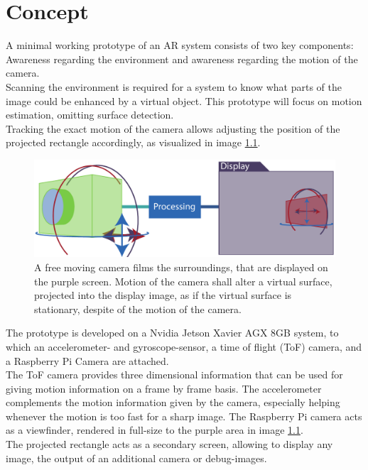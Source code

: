 \chapter{Concept}
\label{sec:Concept}
A minimal working prototype of an AR system consists of two key components: Awareness regarding the environment and awareness regarding the motion of the camera.\\
Scanning the environment is required for a system to know what parts of the image could be enhanced by a virtual object. This prototype will focus on motion estimation, omitting surface detection.\\
Tracking the exact motion of the camera allows adjusting the position of the projected rectangle accordingly, as visualized in image \ref{fig:HW_concept}.
\begin{figure}[H]
    \centering
    \includegraphics[width=1.0\textwidth]{images/concept_image.pdf}
    \caption{A free moving camera films the surroundings, that are displayed on the purple screen. Motion of the camera shall alter a virtual surface, projected into the display image, as if the virtual surface is stationary, despite of the motion of the camera.}
    \label{fig:HW_concept}
\end{figure}
The prototype is developed on a Nvidia Jetson Xavier AGX 8GB system, to which an accelerometer- and gyroscope-sensor, a time of flight (ToF) camera, and a Raspberry Pi Camera are attached.\\
The ToF camera provides three dimensional information that can be used for giving motion information on a frame by frame basis. The accelerometer complements the motion information given by the camera, especially helping whenever the motion is too fast for a sharp image. The Raspberry Pi camera acts as a viewfinder, rendered in full-size to the purple area in image \ref{fig:HW_concept}.\\
The projected rectangle acts as a secondary screen, allowing to display any image, the output of an additional camera or debug-images.
